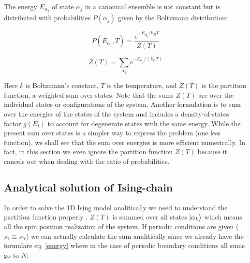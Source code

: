 \documentclass[12pt]{article}
\theoremstyle{plain}
\begin{document}
\vspace{2mm}

\par The energy $E_{\alpha_j}$ of state $\alpha_j$ in a canonical ensemble is not constant but is distributed with
probabilities $P(\alpha_j)$ given by the Boltzmann distribution:

\vspace{2mm}

\begin{equation*}
    P(E_{\alpha_j}, T) = \frac{e^{-E_{\alpha_j} / k_B T}}{Z(T)}
\end{equation*}

\vspace{2mm}

\begin{equation*}
    Z(T) = \sum_{\alpha_j} e^{-E_{\alpha_j} / (k_B T)}
\end{equation*}

\vspace{2mm}

\par Here $k$ is Boltzmann’s constant, $T$ is the temperature, and $Z(T)$ is the partition function,
a weighted sum over states. Note that the sums $Z(T)$ are over the individual states or
configurations of the system. Another formulation is to sum over the energies of the states of the system and includes a density-of-states
factor $g(E_i)$ to account for degenerate states with the same energy. While the present sum over
states is a simpler way to express the problem (one less function), we shall see that the sum
over energies is more efficient numerically. In fact, in this section we even ignore the partition
function $Z(T)$ because it cancels out when dealing with the ratio of probabilities. \cite{landau}

\vspace{2mm}

\subsection{Analytical solution of Ising-chain}

\vspace{2mm}

\par In order to solve the 1D Ising model analitically we need to understand the 
partition function properly \cite{exactising}. $Z(T)$ is summed over all states $\ket{\alpha_k}$ which means
all the spin position realization of the system. If periodic conditions are given ($s_1 \equiv s_N$)
we can actually calculate the sum analitically since we already have the formulare eq. \ref{energy}
where in the case of periodic boundary conditions all sums go to $N$:
\end{document}
